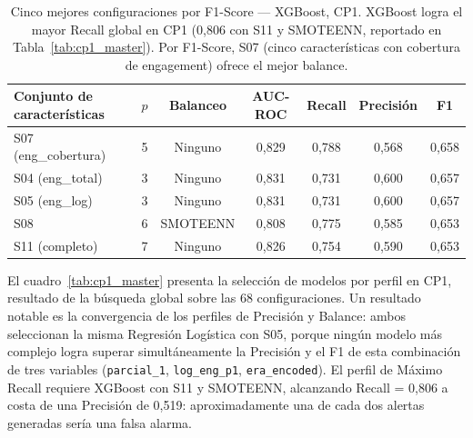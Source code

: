 \documentclass[12pt, letterpaper, openany]{report}
\begin{document}
\begin{table}[!htbp]
  \centering
  \caption{Cinco mejores configuraciones por F1-Score --- XGBoost, CP1. XGBoost logra el mayor Recall global en CP1 (0,806 con S11 y SMOTEENN, reportado en Tabla~\ref{tab:cp1_master}). Por F1-Score, S07 (cinco características con cobertura de engagement) ofrece el mejor balance.}
  \label{tab:cp1_xgb}
  \small
  \begin{tabular}{lcccccc}
    \toprule
    Conjunto de características & $p$ & Balanceo & AUC-ROC & Recall & Precisión & F1 \\
    \midrule
    S07 (eng\_cobertura) & 5 & Ninguno  & 0,829 & 0,788 & 0,568 & 0,658 \\
    S04 (eng\_total)     & 3 & Ninguno  & 0,831 & 0,731 & 0,600 & 0,657 \\
    S05 (eng\_log)       & 3 & Ninguno  & 0,831 & 0,731 & 0,600 & 0,657 \\
    S08                  & 6 & SMOTEENN & 0,808 & 0,775 & 0,585 & 0,653 \\
    S11 (completo)       & 7 & Ninguno  & 0,826 & 0,754 & 0,590 & 0,653 \\
    \bottomrule
  \end{tabular}
\end{table}

\FloatBarrier

El cuadro~\ref{tab:cp1_master} presenta la selección de modelos por perfil en CP1, resultado de la búsqueda global sobre las 68 configuraciones. Un resultado notable es la convergencia de los perfiles de Precisión y Balance: ambos seleccionan la misma Regresión Logística con S05, porque ningún modelo más complejo logra superar simultáneamente la Precisión y el F1 de esta combinación de tres variables (\texttt{parcial\_1}, \texttt{log\_eng\_p1}, \texttt{era\_encoded}). El perfil de Máximo Recall requiere XGBoost con S11 y SMOTEENN, alcanzando Recall = 0,806 a costa de una Precisión de 0,519: aproximadamente una de cada dos alertas generadas sería una falsa alarma.
\end{document}
